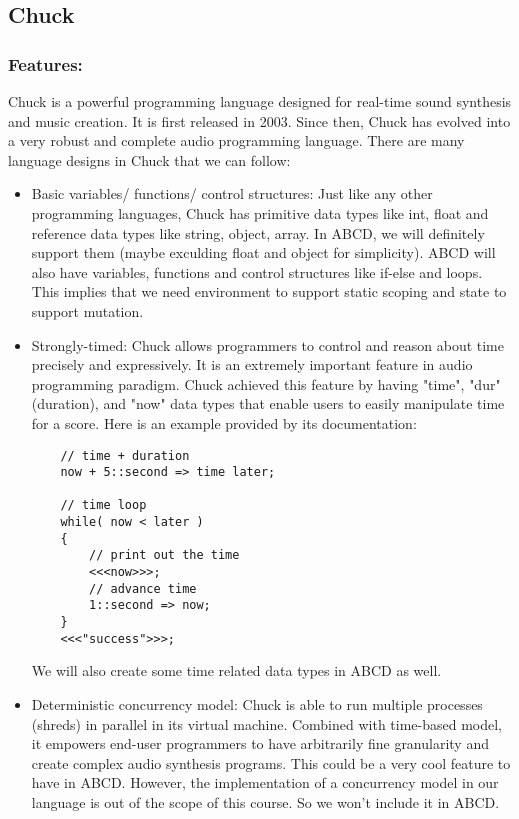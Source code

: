 \subsection{Chuck}

    \subsubsection{Features:}
    Chuck is a powerful programming language designed for real-time sound synthesis and music creation\cite{WangCook02}. It is first released in 2003\cite{Wang15}. Since then, Chuck has evolved into a very robust and complete audio programming language. There are many language designs in Chuck that we can follow:
    \begin{itemize}
    \item Basic variables/ functions/ control structures: Just like any other programming languages, Chuck has primitive data types like int, float and reference data types like string, object, array. In ABCD, we will definitely support them (maybe exculding float and object for simplicity). ABCD will also have variables, functions and control structures like if-else and loops. This implies that we need environment to support static scoping and state to support mutation.
    \item Strongly-timed: Chuck allows programmers to control and reason about time precisely and expressively. It is an extremely important feature in audio programming paradigm. Chuck achieved this feature by having "time", "dur"(duration), and "now" data types that enable users to easily manipulate time for a score. Here is an example provided by its documentation:
    \begin{verbatim}
    // time + duration
    now + 5::second => time later;

    // time loop
    while( now < later )
    {
        // print out the time
        <<<now>>>;
        // advance time
        1::second => now;
    }
    <<<"success">>>;
    \end{verbatim}
    We will also create some time related data types in ABCD as well.
    \item Deterministic concurrency model: Chuck is able to run multiple processes (shreds) in parallel in its virtual machine. Combined with time-based model, it empowers end-user programmers to have arbitrarily fine granularity and create complex audio synthesis programs. This could be a very cool feature to have in ABCD. However, the implementation of a concurrency model in our language is out of the scope of this course. So we won't include it in ABCD.
    \end{itemize}

